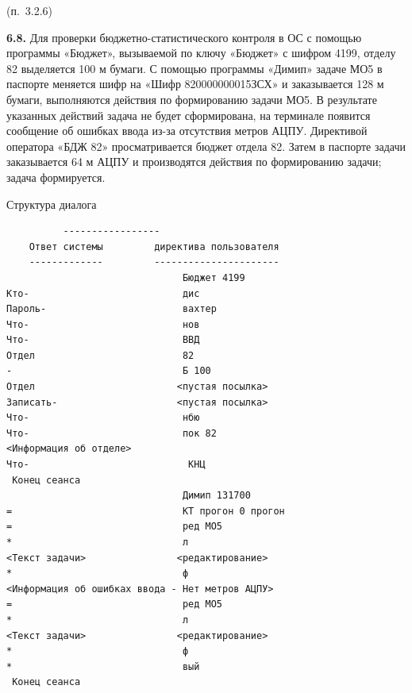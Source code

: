\documentclass[11pt,a4paper]{article}
\begin{document}
\begin{center}(п.~3.2.6)\end{center}
\par\textbf{6.8.} Для проверки бюджетно-статистического контроля в ОС с помощью программы «Бюджет», вызываемой по ключу «Бюджет» с шифром 4199, отделу 82 выделяется 100 м бумаги. С помощью программы «Димип» задаче МО5 в паспорте меняется шифр на «Шифр 820000000015ЗСХ» и заказывается 128 м бумаги, выполняются действия по формированию задачи МО5. В результате указанных действий задача не будет сформирована, на терминале появится сообщение об ошибках ввода из-за отсутствия метров АЦПУ. Директивой оператора «БДЖ 82» просматривается бюджет отдела 82. Затем в паспорте задачи заказывается 64 м АЦПУ и производятся действия по формированию задачи; задача формируется.\par
\begin{center}Структура диалога\end{center}
\begin{center}\small
\begin{BVerbatim}
          -----------------
    Ответ системы         директива пользователя
    -------------         ----------------------
                               Бюджет 4199
Кто-                           дис
Пароль-                        вахтер
Что-                           нов
Что-                           ВВД
Отдел                          82
-                              Б 100
Отдел                         <пустая посылка>
Записать-                     <пустая посылка>
Что-                           нбю
Что-                           пок 82
<Информация об отделе>
Что-                            КНЦ
 Конец сеанса
                               Димип 131700
=                              КТ прогон 0 прогон
=                              ред МО5
*                              л
<Текст задачи>                <редактирование>
*                              ф
<Информация об ошибках ввода - Нет метров АЦПУ>
=                              ред МО5
*                              л
<Текст задачи>                <редактирование>
*                              ф
*                              вый
 Конец сеанса
\end{BVerbatim}
\end{center}
\end{document}
